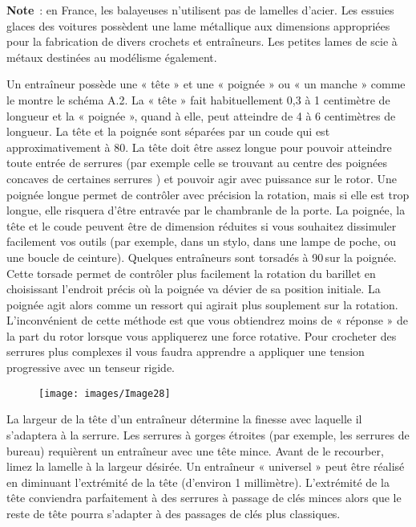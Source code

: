 \documentclass[a4paper,french,11pt,twoside]{report}
\begin{document}
\medskip
\noindent \textbf{Note}~: en France, les balayeuses n'utilisent pas de lamelles d'acier. Les essuies glaces des voitures possèdent une lame métallique aux dimensions appropriées pour la fabrication de divers crochets et entraîneurs. Les petites lames de scie à métaux destinées au modélisme également.

\medskip
Un entraîneur possède une « tête » et une « poignée » ou « un manche » comme le montre le schéma A.2. La « tête » fait habituellement 0,3 à 1 centimètre de longueur et la « poignée », quand à elle, peut atteindre de 4 à 6 centimètres de longueur. La tête et la poignée sont séparées par un coude qui est approximativement à 80\textdegree{}. La tête doit être assez longue pour pouvoir atteindre toute entrée de serrures (par exemple celle se trouvant au centre des poignées concaves de certaines serrures ) et pouvoir agir avec puissance sur le rotor. Une poignée longue permet de contrôler avec précision la rotation, mais si elle est trop longue, elle risquera d'être entravée par le chambranle de la porte. La poignée, la tête et le coude peuvent être de dimension réduites si vous souhaitez dissimuler facilement vos outils (par exemple, dans un stylo, dans une lampe de poche, ou une boucle de ceinture). Quelques entraîneurs sont torsadés à 90\textdegree{}\,sur la poignée. Cette torsade permet de contrôler plus facilement la rotation du barillet en choisissant l'endroit précis où la poignée va dévier de sa position initiale. La poignée agit alors comme un ressort qui agirait plus souplement sur la rotation. L'inconvénient de cette méthode est que vous obtiendrez moins de « réponse » de la part du rotor lorsque vous appliquerez une force rotative. Pour crocheter des serrures plus complexes il vous faudra apprendre a appliquer une tension progressive avec un tenseur rigide.

\begin{figure}[ht]
  \begin{center}
    \texttt{[image: images/Image28]}
    \caption{}
  \end{center}
\end{figure}

La largeur de la tête d'un entraîneur détermine la finesse avec laquelle il s'adaptera à la serrure. Les serrures à gorges étroites (par exemple, les serrures de bureau) requièrent un entraîneur avec une tête mince. Avant de le recourber, limez la lamelle à la largeur désirée. Un entraîneur « universel » peut être réalisé en diminuant l'extrémité de la tête (d'environ 1 millimètre). L'extrémité de la tête conviendra parfaitement à des serrures à passage de clés minces alors que le reste de tête pourra s'adapter à des passages de clés plus classiques.
\end{document}

